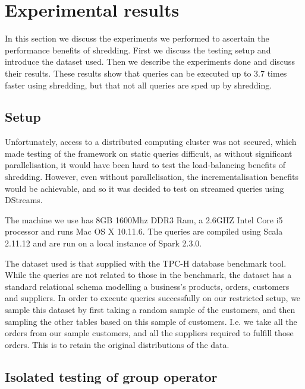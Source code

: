 \chapter{Experimental results} \label{results}

In this section we discuss the experiments we performed to ascertain the performance benefits of shredding. First we discuss the testing setup and introduce the dataset used. Then we describe the experiments done and discuss their results. These results show that queries can be executed up to 3.7 times faster using shredding, but that not all queries are sped up by shredding.

\section{Setup}

Unfortunately, access to a distributed computing cluster was not secured, which made testing of the framework on static queries difficult, as without significant parallelisation, it would have been hard to test the load-balancing benefits of shredding. However, even without parallelisation, the incrementalisation benefits would be achievable, and so it was decided to test on streamed queries using DStreams.

The machine we use has 8GB 1600Mhz DDR3 Ram, a 2.6GHZ Intel Core i5 processor and runs Mac OS X 10.11.6. The queries are compiled using Scala 2.11.12 and are run on a local instance of Spark 2.3.0. 

The dataset used is that supplied with the TPC-H \cite{tpch} database benchmark tool. While the queries are not related to those in the benchmark, the dataset has a standard relational schema modelling a business's products, orders, customers and suppliers. In order to execute queries successfully on our restricted setup, we sample this dataset by first taking a random sample of the customers, and then sampling the other tables based on this sample of customers. I.e. we take all the orders from our sample customers, and all the suppliers required to fulfill those orders. This is to retain the original distributions of the data.

\section{Isolated testing of group operator}

